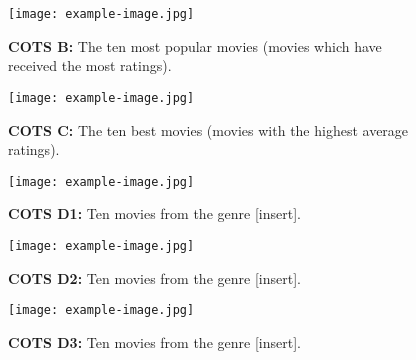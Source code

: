 \begin{figure}[!h]
    \centering
    \texttt{[image: example-image.jpg]}
    \caption{\textbf{COTS B:} The ten most popular movies (movies which have received the most ratings).}
    \label{fig:cots_vis_b}
\end{figure}

\begin{figure}[!h]
    \centering
    \texttt{[image: example-image.jpg]}
    \caption{\textbf{COTS C:} The ten best movies (movies with the highest average ratings).}
    \label{fig:cots_vis_c}
\end{figure}

\begin{figure}[!h]
    \centering
    \texttt{[image: example-image.jpg]}
    \caption{\textbf{COTS D1:} Ten movies from the genre [insert].}
    \label{fig:cots_vis_d1}
\end{figure}

\begin{figure}[!h]
    \centering
    \texttt{[image: example-image.jpg]}
    \caption{\textbf{COTS D2:} Ten movies from the genre [insert].}
    \label{fig:cots_vis_d2}
\end{figure}

\begin{figure}[!h]
    \centering
    \texttt{[image: example-image.jpg]}
    \caption{\textbf{COTS D3:} Ten movies from the genre [insert].}
    \label{fig:cots_vis_d3}
\end{figure}


